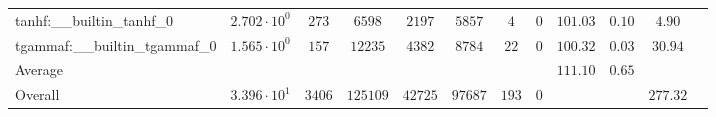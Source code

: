 \begin{tabular}{|l|c|c|c|c|c|c|c|c|c|c|c|}
tanhf:\_\_builtin\_tanhf\_0               & $ 2.702 \cdot 10^{0}  $ & $ 273    $ & $ 6598   $ & $ 2197  $ & $ 5857  $ & $ 4   $ & $ 0 $ & $ 101.03      $ & $ 0.10    $ & $ 4.90    $ \\
tgammaf:\_\_builtin\_tgammaf\_0           & $ 1.565 \cdot 10^{0}  $ & $ 157    $ & $ 12235  $ & $ 4382  $ & $ 8784  $ & $ 22  $ & $ 0 $ & $ 100.32      $ & $ 0.03    $ & $ 30.94   $ \\
\hline
Average                                   & $                     $ & $        $ & $        $ & $       $ & $       $ & $     $ & $   $ & $ 111.10      $ & $ 0.65    $ & $         $ \\
\hline
Overall                                   & $ 3.396 \cdot 10^{1}  $ & $ 3406   $ & $ 125109 $ & $ 42725 $ & $ 97687 $ & $ 193 $ & $ 0 $ & $             $ & $         $ & $ 277.32  $ \\
\hline
\end{tabular}
